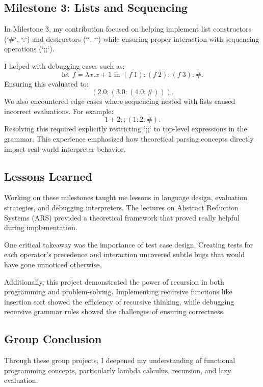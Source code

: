 \documentclass{article}
\begin{document}
\subsection{Milestone 3: Lists and Sequencing}
In Milestone 3, my contribution focused on helping implement list constructors (`\#`, `:`) and destructors (``, ``) while ensuring proper interaction with sequencing operations (`;;`). 

I helped with debugging cases such as:
\[
\text{let } f = \lambda x. x + 1 \text{ in } (f\ 1) : (f\ 2) : (f\ 3) : \#.
\]
Ensuring this evaluated to:
\[
(2.0 : (3.0 : (4.0 : \#))).
\]
We also encountered edge cases where sequencing nested with lists caused incorrect evaluations. For example:
\[
1 + 2 ;; (1 : 2 : \#).
\]
Resolving this required explicitly restricting `;;` to top-level expressions in the grammar. This experience emphasized how theoretical parsing concepts directly impact real-world interpreter behavior.

\subsection{Lessons Learned}
Working on these milestones taught me  lessons in language design, evaluation strategies, and debugging interpreters. The lectures on Abstract Reduction Systems (ARS) provided a theoretical framework that proved really helpful during implementation. 

One critical takeaway was the importance of test case design. Creating tests for each operator's precedence and interaction uncovered subtle bugs that would have gone unnoticed otherwise.

Additionally, this project demonstrated the power of recursion in both programming and problem-solving. Implementing recursive functions like insertion sort showed the efficiency of recursive thinking, while debugging recursive grammar rules showed the challenges of ensuring correctness.

\subsection*{Group Conclusion}
Through these group projects, I deepened my understanding of functional programming concepts, particularly lambda calculus, recursion, and lazy evaluation.
\end{document}
